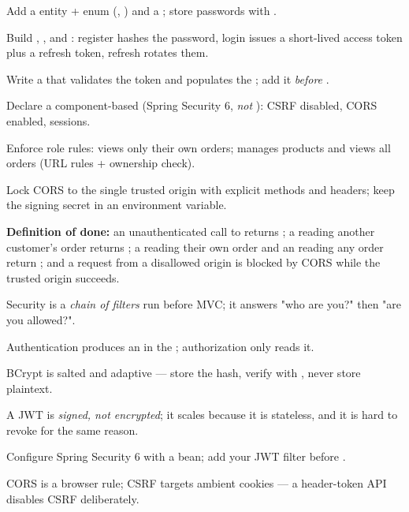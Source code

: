 \begin{buildalong}
\begin{wbitem}
  \item Add a  entity +  enum (, ) and a ; store passwords with .
  \item Build , , and : register hashes the password, login issues a short-lived access token plus a refresh token, refresh rotates them.
  \item Write a  that validates the  token and populates the ; add it \emph{before} .
  \item Declare a component-based  (Spring Security 6, \emph{not} ): CSRF disabled, CORS enabled,  sessions.
  \item Enforce role rules:  views only their own orders;  manages products and views all orders (URL rules +  ownership check).
  \item Lock CORS to the single trusted origin  with explicit methods and headers; keep the signing secret in an environment variable.
\end{wbitem}
\smallskip\textbf{Definition of done:} an unauthenticated call to  returns ; a  reading another customer's order returns ; a  reading their own order and an  reading any order return ; and a request from a disallowed origin is blocked by CORS while the trusted origin succeeds.
\end{buildalong}


\begin{tickcheck}
  \item Security is a \emph{chain of filters} run before MVC; it answers "who are you?" then "are you allowed?".
  \item Authentication produces an  in the ; authorization only reads it.
  \item BCrypt is salted and adaptive --- store the hash, verify with , never store plaintext.
  \item A JWT is \emph{signed, not encrypted}; it scales because it is stateless, and it is hard to revoke for the same reason.
  \item Configure Spring Security 6 with a  bean; add your JWT filter before .
  \item CORS is a browser rule; CSRF targets ambient cookies --- a header-token API disables CSRF deliberately.
\end{tickcheck}

